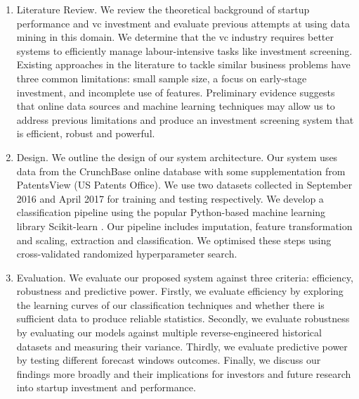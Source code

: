 \documentclass[../thesis/thesis.tex]{subfiles}
\begin{document}
\begin{enumerate}

\item Literature Review. We review the theoretical background of startup performance and \gls{vc} investment and evaluate previous attempts at using data mining in this domain. We determine that the \gls{vc} industry requires better systems to efficiently manage labour-intensive tasks like investment screening. Existing approaches in the literature to tackle similar business problems have three common limitations: small sample size, a focus on early-stage investment, and incomplete use of features. Preliminary evidence suggests that online data sources and machine learning techniques may allow us to address previous limitations and produce an investment screening system that is efficient, robust and powerful.

\item Design. We outline the design of our system architecture. Our system uses data from the CrunchBase online database with some supplementation from PatentsView (US Patents Office). We use two datasets collected in September 2016 and April 2017 for training and testing respectively. We develop a classification pipeline using the popular Python-based machine learning library Scikit-learn \cite{pedregosa2011}. Our pipeline includes imputation,  feature transformation and scaling, extraction and classification. We optimised these steps using cross-validated randomized hyperparameter search.

\item Evaluation. We evaluate our proposed system against three criteria: efficiency, robustness and predictive power. Firstly, we evaluate efficiency by exploring the learning curves of our classification techniques and whether there is sufficient data to produce reliable statistics. Secondly, we evaluate robustness by evaluating our models against multiple reverse-engineered historical datasets and measuring their variance. Thirdly, we evaluate predictive power by testing different forecast windows outcomes. Finally, we discuss our findings more broadly and their implications for investors and future research into startup investment and performance.

\end{enumerate}

\end{document}
